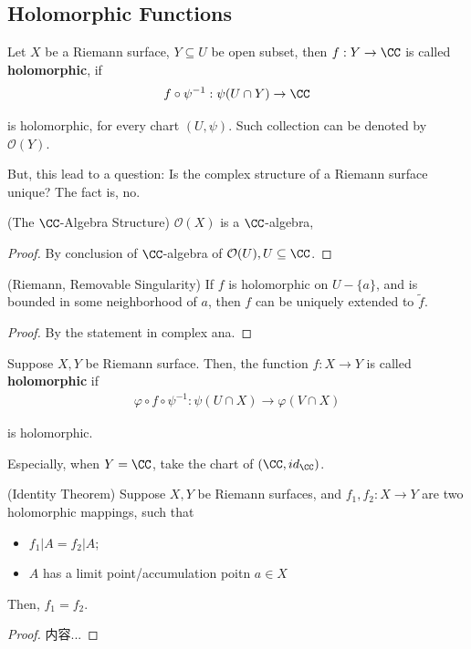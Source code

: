 \documentclass[Total.tex]{subfiles}
\begin{document}
			\subsection{Holomorphic Functions}
			\begin{Def}
				Let $X$ be a Riemann surface, $Y\subseteq U$ be open subset, then $f:Y\rightarrow \CC$ is called \textbf{holomorphic}, if
				\begin{gather*}
					f\circ \psi^{-1}:\psi(U\cap Y)\rightarrow \CC
				\end{gather*}
				
				is holomorphic, for every chart $(U,\psi)$. Such collection can be denoted by $\mathcal{O}(Y)$. 
			\end{Def}
			
			But, this lead to a question: Is the complex structure of a Riemann surface unique? The fact is, no.
			
			\begin{proposition}
				(The $\CC$-Algebra Structure) $\mathcal{O}(X)$ is a $\CC$-algebra,
			\end{proposition}
			\begin{proof}
				By conclusion of $\CC$-algebra of $\mathcal{O}(U),U\subseteq \CC$. 
			\end{proof}
			
			\begin{theorem}
				(Riemann, Removable Singularity) If $f$ is holomorphic on $U-\{a\}$, and is bounded in some neighborhood of $a$, then $f$ can be uniquely extended to $\tilde{f}$. 
			\end{theorem}
			\begin{proof}
				By the statement in complex ana. 
			\end{proof}
			
			\begin{Def}
				Suppose $X,Y$ be Riemann surface. Then, the function $f:X\rightarrow Y$ is called \textbf{holomorphic} if
				\begin{gather*}
					\varphi\circ f\circ \psi^{-1}:\psi(U\cap X)\rightarrow \varphi(V\cap X)
				\end{gather*}
				
				is holomorphic. 
			\end{Def}
			
			Especially, when $Y=\CC$, take the chart of $(\CC,id_\CC)$.
			
			\begin{theorem}
				(Identity Theorem) Suppose $X,Y$ be Riemann surfaces, and $f_1,f_2:X\rightarrow Y$ are two holomorphic mappings, such that 
				\begin{itemize}
					\item $f_1|A=f_2|A$;
					\item $A$ has a limit point/accumulation poitn $a\in X$
				\end{itemize}
				
				Then, $f_1=f_2$. 
			\end{theorem}
			\begin{proof}
				内容...
			\end{proof}
			
\end{document}
